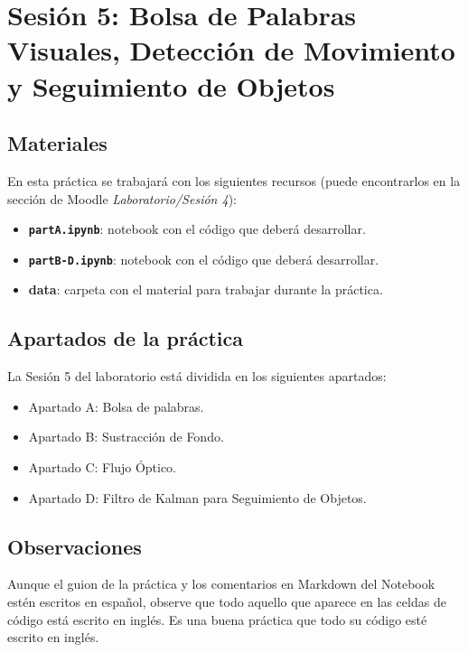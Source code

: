 \chapter{Sesión 5: Bolsa de Palabras Visuales, Detección de Movimiento y Seguimiento de Objetos}
\label{chapter:introduction_ses_5}

\section{Materiales}

En esta práctica se trabajará con los siguientes recursos (puede encontrarlos en la sección de Moodle \textit{Laboratorio/Sesión 4}):

\begin{itemize}
    \item \textbf{\texttt{partA.ipynb}}: notebook con el código que deberá desarrollar.
    \item \textbf{\texttt{partB-D.ipynb}}: notebook con el código que deberá desarrollar.
    \item \textbf{data}: carpeta con el material para trabajar durante la práctica.
\end{itemize}

\section{Apartados de la práctica}

La Sesión 5 del laboratorio está dividida en los siguientes apartados:

\begin{itemize}
    \item Apartado A: Bolsa de palabras.
    \item Apartado B: Sustracción de Fondo.
    \item Apartado C: Flujo Óptico.
    \item Apartado D: Filtro de Kalman para Seguimiento de Objetos.

\end{itemize}

\section{Observaciones}

Aunque el guion de la práctica y los comentarios en Markdown del Notebook estén escritos en español, observe que todo aquello que aparece en las celdas de código está escrito en inglés. Es una buena práctica que todo su código esté escrito en inglés.

